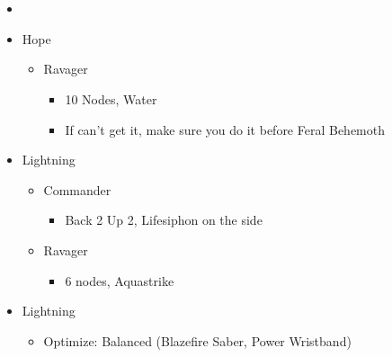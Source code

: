 \chapter{}

\begin{menu}
\begin{itemize}
    \paradigm
    \begin{itemize}
        \item {}%
{\paradigmline[1]{\textit{\rav}}{\textit{\com}}{}}%
{\paradigmline{(\med)}{(\com)}{}}%
{\paradigmline{\syn}{(\com)}{}}%
{\paradigmline{\rav}{\rav}{}}%
{\paradigmline{\rav}{[\rav]}{}}%
{\paradigmline{[\rav]}{\com}{}}
    \end{itemize}
    \crystarium
    \begin{itemize}
        \item Hope
        \begin{itemize}
            \item Ravager
            \begin{itemize}
                \item 10 Nodes, Water
                \item If can't get it, make sure you do it before Feral Behemoth
            \end{itemize}
        \end{itemize}
        \item Lightning
        \begin{itemize}
            \item Commander
            \begin{itemize}
                \item Back 2 Up 2, Lifesiphon on the side
            \end{itemize}
            \item Ravager
            \begin{itemize}
                \item 6 nodes, Aquastrike
            \end{itemize}
        \end{itemize}
    \end{itemize}
    \equip
    \begin{itemize}
        \item Lightning
        \begin{itemize}
            \item Optimize: Balanced (Blazefire Saber, Power Wristband)
        \end{itemize}
    \end{itemize}
\end{itemize}
\end{menu}

